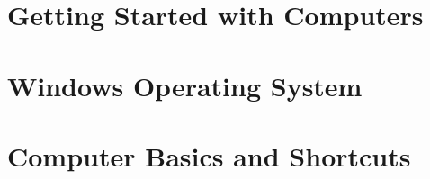 \documentclass[12pt, a4paper, twoside, openany]{book}
\begin{document}
\frontmatter







\tableofcontents
\clearpage


\mainmatter


\part{Getting Started with Computers}










\part{Windows Operating System}















\part{Computer Basics and Shortcuts}
\end{document}
